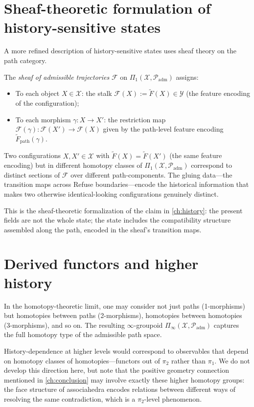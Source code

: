 \documentclass[12pt, oneside]{memoir}
\newcommand{\X}{\mathcal{X}}
\newcommand{\Ft}{\widetilde{F}}
\newcommand{\Fpath}{\widetilde{F}_{\mathrm{path}}}
\newcommand{\Padm}{\mathcal{P}_{\mathrm{adm}}}
\begin{document}
\section{Sheaf-theoretic formulation of history-sensitive states}

A more refined description of history-sensitive states uses sheaf theory on the path
category.

\begin{definition}
\label{def:sheaf}
The \emph{sheaf of admissible trajectories} $\mathcal{F}$ on $\Pi_1(\X, \Padm)$ assigns:
\begin{itemize}
  \item To each object $X \in \X$: the stalk $\mathcal{F}(X) := \Ft(X) \in \mathcal{Y}$
        (the feature encoding of the configuration);
  \item To each morphism $\gamma: X \to X'$: the restriction map
        $\mathcal{F}(\gamma): \mathcal{F}(X') \to \mathcal{F}(X)$ given by the
        path-level feature encoding $\Fpath(\gamma)$.
\end{itemize}
\end{definition}

Two configurations $X, X' \in \X$ with $\Ft(X) = \Ft(X')$ (the same feature encoding)
but in different homotopy classes of $\Pi_1(\X, \Padm)$ correspond to distinct sections
of $\mathcal{F}$ over different path-components.  The gluing data---the transition maps
across Refuse boundaries---encode the historical information that makes two otherwise
identical-looking configurations genuinely distinct.

This is the sheaf-theoretic formalization of the claim in \cref{ch:history}: the present
fields are not the whole state; the state includes the compatibility structure assembled
along the path, encoded in the sheaf's transition maps.

\section{Derived functors and higher history}

In the homotopy-theoretic limit, one may consider not just paths (1-morphisms) but
homotopies between paths (2-morphisms), homotopies between homotopies (3-morphisms), and
so on.  The resulting $\infty$-groupoid $\Pi_\infty(\X, \Padm)$ captures the full
homotopy type of the admissible path space.

History-dependence at higher levels would correspond to observables that depend on
homotopy classes of homotopies---functors out of $\pi_2$ rather than $\pi_1$.  We do not
develop this direction here, but note that the positive geometry connection mentioned in
\cref{ch:conclusion} may involve exactly these higher homotopy groups: the face structure
of associahedra encodes relations between different ways of resolving the same
contradiction, which is a $\pi_2$-level phenomenon.
\end{document}
